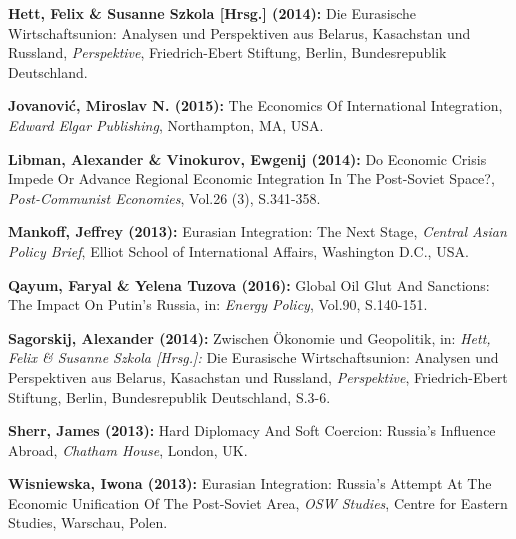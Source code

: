 \documentclass[11pt,a4paper]{article}
\begin{document}
\begin{compactitem}
\begin{small}
	
	\item [\Rectsteel] \textbf{Hett, Felix \& Susanne Szkola [Hrsg.] (2014):} Die Eurasische Wirtschaftsunion: Analysen und Perspektiven aus Belarus, Kasachstan und Russland, \textsl{Perspektive}, Friedrich-Ebert Stiftung, Berlin, Bundesrepublik Deutschland.
	
	
	\item [\Rectsteel] \textbf{Jovanovi\'{c}, Miroslav N. (2015):} The Economics Of International Integration, \textsl{Edward Elgar Publishing}, Northampton, MA, USA.
	
	
	\item [\Rectsteel] \textbf{Libman, Alexander \& Vinokurov, Ewgenij (2014):} Do Economic Crisis Impede Or Advance Regional Economic Integration In The Post-Soviet Space?, \textsl{Post-Communist Economies}, Vol.26 (3), S.341-358.
	
	
	\item [\Rectsteel] \textbf{Mankoff, Jeffrey (2013):} Eurasian Integration: The Next Stage, \textsl{Central Asian Policy Brief}, Elliot School of International Affairs, Washington D.C., USA.
	
	
	\item [\Rectsteel] \textbf{Qayum, Faryal \& Yelena Tuzova (2016):} Global Oil Glut And Sanctions: The Impact On Putin's Russia, in: \textsl{Energy Policy}, Vol.90, S.140-151.
	
	
	\item [\Rectsteel] \textbf{Sagorskij, Alexander (2014):} Zwischen Ökonomie und Geopolitik, in: \textsl{Hett, Felix \& Susanne Szkola [Hrsg.]:} Die Eurasische Wirtschaftsunion: Analysen und Perspektiven aus Belarus, Kasachstan und Russland, \textsl{Perspektive}, Friedrich-Ebert Stiftung, Berlin, Bundesrepublik Deutschland, S.3-6.
	
	
	\item [\Rectsteel] \textbf{Sherr, James (2013):} Hard Diplomacy And Soft Coercion: Russia's Influence Abroad, \textsl{Chatham House}, London, UK.
	
	
	\item [\Rectsteel] \textbf{Wisniewska, Iwona (2013):} Eurasian Integration: Russia's Attempt At The Economic Unification Of The Post-Soviet Area, \textsl{OSW Studies}, Centre for Eastern Studies, Warschau, Polen.
	
	
	
	
\end{small}
	
	
	
\end{compactitem}
\end{document}
